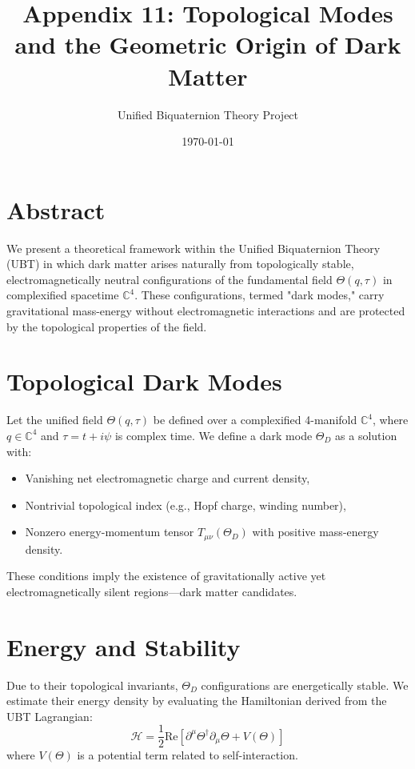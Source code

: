 \documentclass[12pt]{article}
\title{Appendix 11: Topological Modes and the Geometric Origin of Dark Matter}
\author{Unified Biquaternion Theory Project}
\date{\today}
\begin{document}
\maketitle


\SpeculativeContentWarning

\section*{Abstract}
We present a theoretical framework within the Unified Biquaternion Theory (UBT) in which dark matter arises naturally from topologically stable, electromagnetically neutral configurations of the fundamental field \( \Theta(q, \tau) \) in complexified spacetime \( \mathbb{C}^4 \). These configurations, termed "dark modes," carry gravitational mass-energy without electromagnetic interactions and are protected by the topological properties of the field.

\section{Topological Dark Modes}
Let the unified field \( \Theta(q, \tau) \) be defined over a complexified 4-manifold \( \mathbb{C}^4 \), where \( q \in \mathbb{C}^4 \) and \( \tau = t + i\psi \) is complex time. We define a dark mode \( \Theta_D \) as a solution with:

\begin{itemize}
  \item Vanishing net electromagnetic charge and current density,
  \item Nontrivial topological index (e.g., Hopf charge, winding number),
  \item Nonzero energy-momentum tensor \( T_{\mu\nu}(\Theta_D) \) with positive mass-energy density.
\end{itemize}

These conditions imply the existence of gravitationally active yet electromagnetically silent regions—dark matter candidates.

\section{Energy and Stability}
Due to their topological invariants, \( \Theta_D \) configurations are energetically stable. We estimate their energy density by evaluating the Hamiltonian derived from the UBT Lagrangian:
\begin{equation}
\mathcal{H} = \frac{1}{2} \text{Re} \left[ \partial^\mu \Theta^\dagger \partial_\mu \Theta + V(\Theta) \right]
\end{equation}
where \( V(\Theta) \) is a potential term related to self-interaction.
\end{document}
